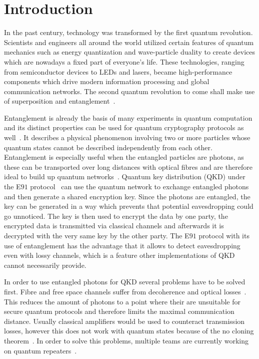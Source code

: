 \chapter{Introduction}

In the past century, technology was transformed by the first quantum revolution. Scientists and engineers all around the world utilized certain features of quantum mechanics such as energy quantization and wave-particle duality to create devices which are nowadays a fixed part of everyone's life.
These technologies, ranging from semiconductor devices to LEDs and lasers, became high-performance components which drive modern information processing and global communication networks.
The second quantum revolution to come shall make use of superposition and entanglement~\cite{aharonovich_solid-state_2016}\cite{macfarlane_quantum_2003}.

Entanglement is already the basis of many experiments in quantum computation and its distinct properties can be used for quantum cryptography protocols as well~\cite{zeilinger_light_2017}.
It describes a physical phenomenon involving two or more particles whose quantum states cannot be described independently from each other.
Entanglement is especially useful when the entangled particles are photons, as these can be transported over long distances with optical fibres and are therefore ideal to build up quantum networks~\cite{gisin_quantum_2002}.
Quantum key distribution (QKD) under the E$91$ protocol~\cite{ekert_quantum_1991} can use the quantum network to exchange entangled photons and then generate a shared encryption key.
Since the photons are entangled, the key can be generated in a way which prevents that potential eavesdropping could go unnoticed.
The key is then used to encrypt the data by one party, the encrypted data is transmitted via classical channels and afterwards it is decrypted with the very same key by the other party.
The E$91$ protocol with its use of entanglement has the advantage that it allows to detect eavesdropping even with lossy channels, which is a feature other implementations of QKD cannot necessarily provide.

In order to use entangled photons for QKD several problems have to be solved first.
Fibre and free space channels suffer from decoherence and optical losses~\cite{sangouard_quantum_2011}.
This reduces the amount of photons to a point where their are unsuitable for secure quantum protocols and therefore limits the maximal communication distance.
Usually classical amplifiers would be used to counteract transmission losses, however this does not work with quantum states because of the no cloning theorem~\cite{park_concept_1970}.
In order to solve this problems, multiple teams are currently working on quantum repeaters~\cite{reindl_all-photonic_2018}\cite{duan_long-distance_2001}\cite{simon_quantum_2007}.


